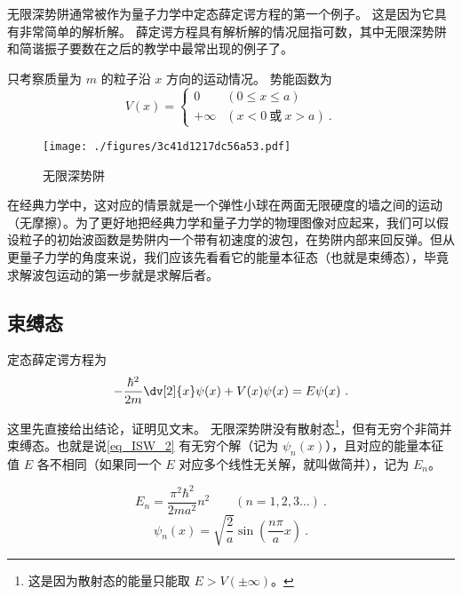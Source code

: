 

无限深势阱通常被作为量子力学中定态薛定谔方程的第一个例子。 这是因为它具有非常简单的解析解。 薛定谔方程具有解析解的情况屈指可数，其中无限深势阱和简谐振子要数在之后的教学中最常出现的例子了。

只考察质量为 $m$ 的粒子沿 $x$ 方向的运动情况。%
势能函数为
\begin{equation}
V(x) =
\begin{cases}
0 \quad &(0 \leqslant x \leqslant a)\\
+\infty  &(x < 0 \ \text{或}\  x > a)~.
\end{cases}
\end{equation}

\begin{figure}[ht]
\centering
\texttt{[image: ./figures/3c41d1217dc56a53.pdf]}
\caption{无限深势阱} \label{fig_ISW_1}
\end{figure}

在经典力学中，这对应的情景就是一个弹性小球在两面无限硬度的墙之间的运动（无摩擦）。为了更好地把经典力学和量子力学的物理图像对应起来，我们可以假设粒子的初始波函数是势阱内一个带有初速度的波包，在势阱内部来回反弹。但从更量子力学的角度来说，我们应该先看看它的能量本征态（也就是束缚态），毕竟求解波包运动的第一步就是求解后者。

\subsection{束缚态}
定态薛定谔方程为
\begin{equation}\label{eq_ISW_2}
-\frac{\hbar ^2}{2m} \dv[2]{x} \psi(x) + V(x)\psi(x) = E\psi(x)~.
\end{equation} 

这里先直接给出结论，证明见文末。 无限深势阱没有散射态\footnote{这是因为散射态的能量只能取 $E > V(\pm\infty)$。}，但有无穷个非简并束缚态。也就是说\autoref{eq_ISW_2} 有无穷个解（记为 $\psi_n(x)$），且对应的能量本征值 $E$ 各不相同（如果同一个 $E$ 对应多个线性无关解，就叫做简并），记为 $E_n$。

\begin{equation}\label{eq_ISW_3}
E_n = \frac{\pi^2 \hbar^2}{2m a^2} n^2 \qquad (n = 1,2,3\dots)~.
\end{equation}
\begin{equation}\label{eq_ISW_1}
\psi_n(x) = \sqrt{\frac{2}{a}} \sin(\frac{n\pi }{a} x)~.
\end{equation}

